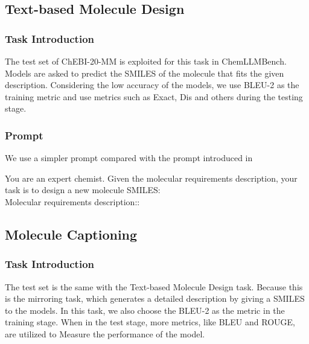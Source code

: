 
\subsection{Text-based Molecule Design}
\subsubsection{Task Introduction}
The test set of ChEBI-20-MM is exploited for this task in ChemLLMBench. Models are asked to predict the SMILES of the molecule that fits the given description. Considering the low accuracy of the models, we use BLEU-2 as the training metric and use metrics such as Exact, Dis and others during the testing stage.
\subsubsection{Prompt}
We use a simpler prompt compared with the prompt introduced in \cite{guo2023largelanguagemodelschemistry}
\begin{tcolorbox}[colback=gray!10, colframe=black, title=Prompt: Text-based Molecule Design]
You are an expert chemist. Given the molecular requirements description, your task is to design a new molecule SMILES:\\
Molecular requirements description::
\end{tcolorbox}
\subsection{Molecule Captioning}
\subsubsection{Task Introduction}
The test set  is the same with the Text-based Molecule Design task. Because this is the mirroring task, which generates a detailed description by giving a SMILES to the models. In this task, we also choose the BLEU-2 as the metric in the training stage. When in the test stage, more metrics, like BLEU and ROUGE, are utilized to Measure the performance of the model.
